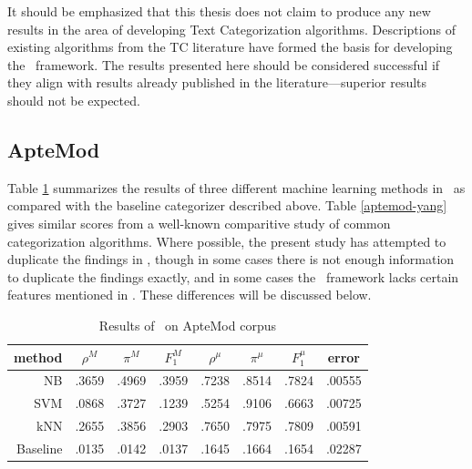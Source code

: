 It should be emphasized that this thesis does not claim to produce any
new results in the area of developing Text Categorization algorithms.
Descriptions of existing algorithms from the TC literature have formed
the basis for developing the \aicat\ framework.  The results presented
here should be considered successful if they align with results
already published in the literature---superior results should not be
expected.

\subsection{ApteMod}

Table \ref{aptemod-results} summarizes the results of three different
machine learning methods in \aicat\ as compared with the baseline
categorizer described above.  Table \ref{aptemod-yang} gives similar
scores from a well-known comparitive study of common categorization
algorithms. \cite{yang:99} Where possible, the present study has
attempted to duplicate the findings in \cite{yang:99}, though in some
cases there is not enough information to duplicate the findings
exactly, and in some cases the \aicat\ framework lacks certain
features mentioned in \cite{yang:99}.  These differences will be
discussed below.

\begin{table}
\begin{center}
\begin{tabular}{|r c c c c c c c|}
\hline
method    & $\rho^M$ & $\pi^M$ & $F_1^M$ & $\rho^\mu$ & $\pi^\mu$ & $F_1^\mu$ &   error \\
\hline
NB        &   .3659  &  .4969  &  .3959  &  .7238     &  .8514    &  .7824    &  .00555 \\
SVM       &   .0868  &  .3727  &  .1239  &  .5254     &  .9106    &  .6663    &  .00725 \\
kNN       &   .2655  &  .3856  &  .2903  &  .7650     &  .7975    &  .7809    &  .00591 \\
Baseline  &   .0135  &  .0142  &  .0137  &  .1645     &  .1664    &  .1654    &  .02287 \\
\hline
\end{tabular}
\end{center}
\caption{Results of \aicat\ on ApteMod corpus}
\label{aptemod-results}
\end{table}

